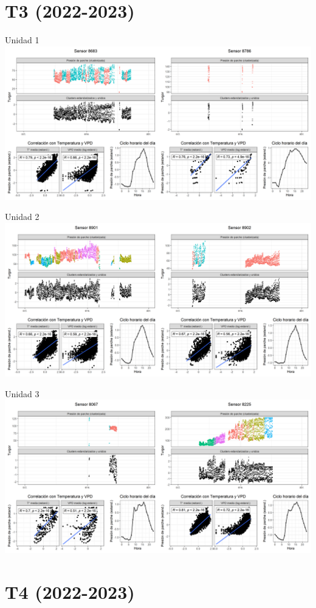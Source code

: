 \documentclass[
  letterpaper,
  DIV=11,
  numbers=noendperiod]{scrreprt}
\begin{document}
\chapter{T3 (2022-2023)}

Unidad 1
\includegraphics{figuras/03_turgor_union/2022_2023_Rio_Claro_T3_Unidad_1.png}

Unidad 2
\includegraphics{figuras/03_turgor_union/2022_2023_Rio_Claro_T3_Unidad_2.png}

Unidad 3
\includegraphics{figuras/03_turgor_union/2022_2023_Rio_Claro_T3_Unidad_3.png}

\chapter{T4 (2022-2023)}
\end{document}
